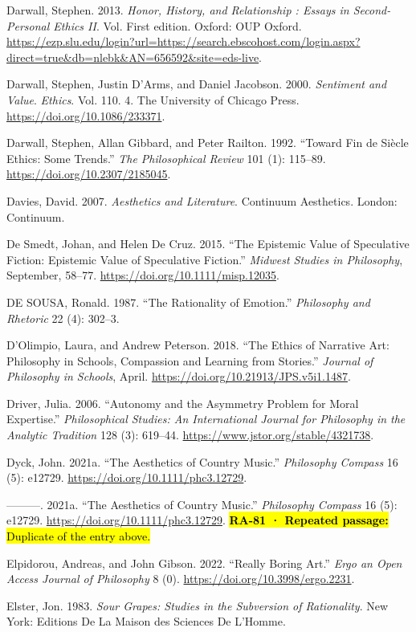 \documentclass[
  letterpaper,
  DIV=11,
  numbers=noendperiod]{scrartcl}
\theoremstyle{remark}
\begin{document}
Darwall, Stephen. 2013. \emph{Honor, History, and Relationship : Essays
in Second-Personal Ethics II}. Vol. First edition. Oxford: OUP Oxford.
\url{https://ezp.slu.edu/login?url=https://search.ebscohost.com/login.aspx?direct=true&db=nlebk&AN=656592&site=eds-live}.

Darwall, Stephen, Justin D'Arms, and Daniel Jacobson. 2000.
\emph{Sentiment and Value}. \emph{Ethics}. Vol. 110. 4. The University
of Chicago Press. \url{https://doi.org/10.1086/233371}.

Darwall, Stephen, Allan Gibbard, and Peter Railton. 1992. ``Toward Fin
de Siècle Ethics: Some Trends.'' \emph{The Philosophical Review} 101
(1): 115--89. \url{https://doi.org/10.2307/2185045}.

Davies, David. 2007. \emph{Aesthetics and Literature}. Continuum
Aesthetics. London: Continuum.

De Smedt, Johan, and Helen De Cruz. 2015. ``The Epistemic Value of
Speculative Fiction: Epistemic Value of Speculative Fiction.''
\emph{Midwest Studies in Philosophy}, September, 58--77.
\url{https://doi.org/10.1111/misp.12035}.

DE SOUSA, Ronald. 1987. ``The Rationality of Emotion.'' \emph{Philosophy
and Rhetoric} 22 (4): 302--3.

D'Olimpio, Laura, and Andrew Peterson. 2018. ``The Ethics of Narrative
Art: Philosophy in Schools, Compassion and Learning from Stories.''
\emph{Journal of Philosophy in Schools}, April.
\url{https://doi.org/10.21913/JPS.v5i1.1487}.

Driver, Julia. 2006. ``Autonomy and the Asymmetry Problem for Moral
Expertise.'' \emph{Philosophical Studies: An International Journal for
Philosophy in the Analytic Tradition} 128 (3): 619--44.
\url{https://www.jstor.org/stable/4321738}.

Dyck, John. 2021a. ``The Aesthetics of Country Music.'' \emph{Philosophy
Compass} 16 (5): e12729. \url{https://doi.org/10.1111/phc3.12729}.

---------. 2021a. ``The Aesthetics of Country Music.'' \emph{Philosophy
Compass} 16 (5): e12729. \url{https://doi.org/10.1111/phc3.12729}.
\hl{\textbf{RA-81 · Repeated passage:} Duplicate of the entry above.}

Elpidorou, Andreas, and John Gibson. 2022. ``Really Boring Art.''
\emph{Ergo an Open Access Journal of Philosophy} 8 (0).
\url{https://doi.org/10.3998/ergo.2231}.

Elster, Jon. 1983. \emph{Sour Grapes: Studies in the Subversion of
Rationality}. New York: Editions De La Maison des Sciences De L'Homme.
\end{document}
